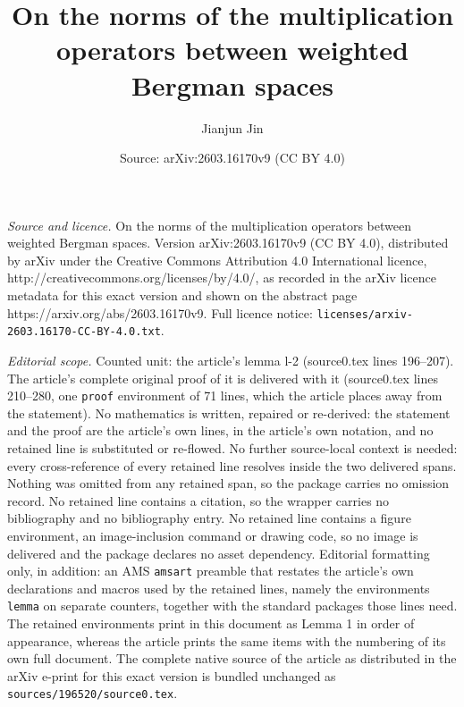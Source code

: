 \documentclass[10pt,a4paper]{amsart}
\title{On the norms of the multiplication operators between weighted Bergman spaces}
\author{Jianjun Jin}
\date{Source: arXiv:2603.16170v9 (CC BY 4.0)}
\begin{document}
\maketitle

\noindent\emph{Source and licence.} On the norms of the multiplication operators between weighted Bergman spaces. Version arXiv:2603.16170v9 (CC BY 4.0), distributed by arXiv under the Creative Commons Attribution 4.0 International licence, http://creativecommons.org/licenses/by/4.0/, as recorded in the arXiv licence metadata for this exact version and shown on the abstract page https://arxiv.org/abs/2603.16170v9. Full licence notice: \texttt{licenses/arxiv-2603.16170-CC-BY-4.0.txt}.\par\smallskip

\noindent\textit{Editorial scope.} Counted unit: the article's lemma l-2 (source0.tex lines 196--207). The article's complete original proof of it is delivered with it (source0.tex lines 210--280, one \texttt{proof} environment of 71 lines, which the article places away from the statement). No mathematics is written, repaired or re-derived: the statement and the proof are the article's own lines, in the article's own notation, and no retained line is substituted or re-flowed.  No further source-local context is needed: every cross-reference of every retained line resolves inside the two delivered spans.  Nothing was omitted from any retained span, so the package carries no omission record.  No retained line contains a citation, so the wrapper carries no bibliography and no bibliography entry.  No retained line contains a figure environment, an image-inclusion command or drawing code, so no image is delivered and the package declares no asset dependency.  Editorial formatting only, in addition: an AMS \texttt{amsart} preamble that restates the article's own declarations and macros used by the retained lines, namely the environments \texttt{lemma} on separate counters, together with the standard packages those lines need.  The retained environments print in this document as Lemma 1 in order of appearance, whereas the article prints the same items with the numbering of its own full document.  The complete native source of the article as distributed in the arXiv e-print for this exact version is bundled unchanged as \texttt{sources/196520/source0.tex}.
\end{document}
